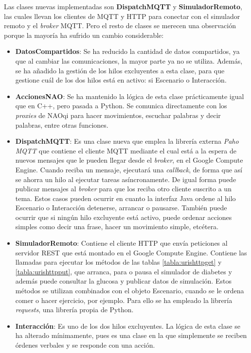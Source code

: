 \documentclass[12pt,spanish,listoffigures,listoftables]{tfgetsinf}
\begin{document}
Las clases nuevas implementadas son \textbf{DispatchMQTT} y \textbf{SimuladorRemoto}, las cuales llevan los clientes de MQTT y HTTP para conectar con el simulador remoto y el \textit{broker} MQTT. Pero el resto de clases se merecen una observación porque la mayoría ha sufrido un cambio considerable:
\begin{itemize}
	\item \textbf{DatosCompartidos}: Se ha reducido la cantidad de datos compartidos, ya que al cambiar las comunicaciones, la mayor parte ya no se utiliza. Además, se ha añadido la gestión de los hilos excluyentes a esta clase, para que gestione cuál de los dos hilos está en activo: si Escenario o Interacción.
	\item \textbf{AccionesNAO}: Se ha mantenido la lógica de esta clase prácticamente igual que en C++, pero pasada a Python. Se comunica directamente con los \textit{proxies} de NAOqi para hacer movimientos, escuchar palabras y decir palabras, entre otras funciones.
	\item \textbf{DispatchMQTT}: Es una clase nueva que emplea la librería externa \textit{Paho MQTT} que contiene el cliente MQTT mediante el cual está a la espera de nuevos mensajes que le pueden llegar desde el \textit{broker}, en el Google Compute Engine. Cuando reciba un mensaje, ejecutará una \textit{callback}, de forma que así se ahorra un hilo al ejecutar tareas asíncronamente. De igual forma puede publicar mensajes al \textit{broker} para que los reciba otro cliente suscrito a un tema. Estos casos pueden ocurrir en cuanto la interfaz Java ordene al hilo Escenario o Interacción detenerse, arrancar o pausarse. También puede ocurrir que si ningún hilo excluyente está activo, puede ordenar acciones simples como decir una frase, hacer un movimiento simple, etcétera.
	\item \textbf{SimuladorRemoto}: Contiene el cliente HTTP que envía peticiones al servidor REST que está montado en el Google Compute Engine. Contiene las llamadas para ejecutar los métodos de las tablas \ref{tabla:urishttpget} y \ref{tabla:urishttpput}, que arranca, para o pausa el simulador de diabetes y además puede consultar la glucosa y publicar datos de simulación. Estos métodos se utilizan combinados con el objeto Escenario, cuando se le ordena comer o hacer ejercicio, por ejemplo. Para ello se ha empleado la librería \textit{requests}, una librería propia de Python.
	\item \textbf{Interacción}: Es uno de los dos hilos excluyentes. La lógica de esta clase se ha alterado mínimamente, pues es una clase en la que simplemente se reciben órdenes verbales y se responde con una acción.

\end{itemize}
\end{document}
